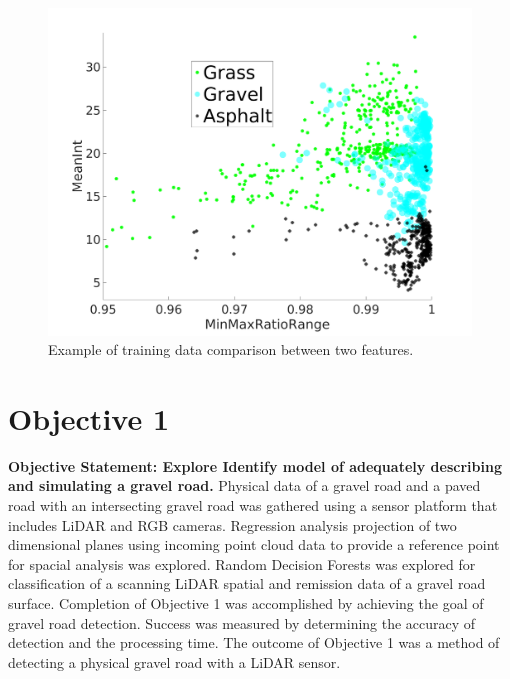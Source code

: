 \documentclass[numbered,pdftex]{ohio-etd}
\begin{document}
{		
		
		\begin{figure}[H]
			\centering
			\includegraphics[width=0.7\linewidth]{Defense_Images/training_data_cluster}
			\caption[Example Clustering]{Example of training data comparison between two features.}
			\label{fig:training_data_cluster}
		\end{figure}
		

	\section{Objective 1}{
		
		{\textbf{Objective Statement: Explore Identify model of adequately describing and simulating a gravel road.} Physical data of a gravel road and a paved road with an intersecting gravel road was gathered using a sensor platform that includes LiDAR and RGB cameras. Regression analysis projection of two dimensional planes using incoming point cloud data to provide a reference point for spacial analysis was explored. Random Decision Forests was explored for classification of a scanning LiDAR spatial and remission data of a gravel road surface. Completion of Objective 1 was accomplished by achieving the goal of gravel road detection. Success was measured by determining the accuracy of detection and the processing time. The outcome of Objective 1 was a method of detecting a physical gravel road with a LiDAR sensor.}
	
}}
\end{document}
